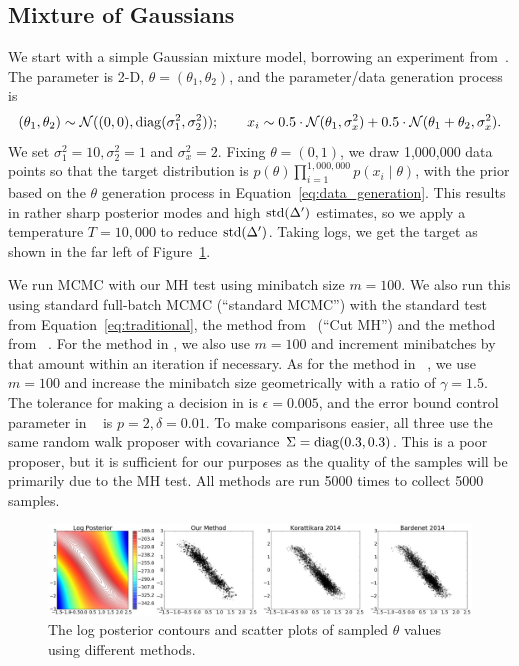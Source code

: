 \documentclass{article}
\begin{document}
\subsection{Mixture of Gaussians}\label{ssec:gaussians}

We start with a simple Gaussian mixture model, borrowing an experiment from~\cite{langevin_2011}.
The parameter is 2-D, $\theta = (\theta_1,\theta_2)$, and the parameter/data generation process is
\begin{equation}\label{eq:data_generation}
(\theta_1,\theta_2) \sim \mathcal{N}((0,0), {\rm diag}(\sigma_1^2, \sigma_2^2));\quad \quad x_i \sim
0.5 \cdot \mathcal{N}(\theta_1, \sigma_x^2) + 0.5 \cdot \mathcal{N}(\theta_1+\theta_2, \sigma_x^2).
\end{equation}
We set $\sigma_1^2 = 10, \sigma_2^2 = 1$ and $\sigma_x^2=2$. Fixing $\theta = (0,1)$, we draw 1,000,000
data points so that the target distribution is $p(\theta)\prod_{i=1}^{1,000,000}p(x_i\mid \theta)$, with
the prior based on the $\theta$ generation process in Equation~\ref{eq:data_generation}. This
results in rather sharp posterior modes and high ${\rm std}(\Delta')$ estimates, so we apply a
temperature $T=10,000$ to reduce ${\rm std}(\Delta')$. Taking logs, we get the target as shown in the
far left of Figure~\ref{fig:gauss_mix_1}.

We run MCMC with our MH test using minibatch size $m=100$. We also run this using standard
full-batch MCMC (``standard MCMC'') with the standard test from Equation~\ref{eq:traditional}, the method
from~\cite{cutting_mh_2014} (``Cut MH'')  and the method from ~\cite{icml2014c1_bardenet14}. For the method in \cite{cutting_mh_2014}, we also use $m=100$ and
increment minibatches by that amount within an iteration if necessary. As for the method in ~\cite{icml2014c1_bardenet14}, we use $m=100$ and increase the minibatch size geometrically with a ratio of $\gamma = 1.5$. The tolerance for making a
decision in \cite{cutting_mh_2014} is $\epsilon=0.005$, and the error bound control parameter in ~\cite{icml2014c1_bardenet14} is $p = 2, \delta = 0.01$. To make comparisons easier, all three use the same random walk proposer
with covariance $\Sigma={\rm diag}(0.3, 0.3)$. This is a poor proposer, but it is sufficient for
our purposes as the quality of the samples will be primarily due to the MH test. All methods are run
5000 times to collect 5000 samples.

\begin{figure}[t]
    \centering
    \includegraphics[width=1\linewidth]{posterior_of_gaussian.png}
    \caption{
    The log posterior contours and scatter plots of sampled $\theta$ values using different methods. 
    }
    \label{fig:gauss_mix_1}
\end{figure}
\end{document}
